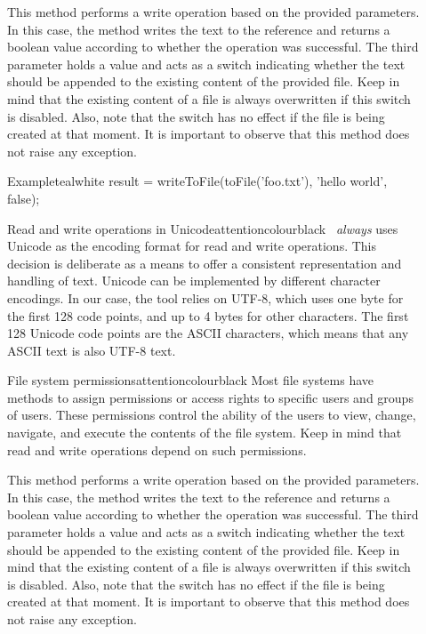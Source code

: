 \begin{description}
\item[] This method performs a write operation based on the provided parameters. In this case, the method writes the  text to the  reference and returns a boolean value according to whether the operation was successful. The third parameter holds a  value and acts as a switch indicating whether the text should be appended to the existing content of the provided file. Keep in mind that the existing content of a file is always overwritten if this switch is disabled. Also, note that the switch has no effect if the file is being created at that moment. It is important to observe that this method does not raise any exception.

\begin{codebox}{Example}{teal}{\icnote}{white}
result = writeToFile(toFile('foo.txt'), 'hello world', false);
\end{codebox}

\begin{messagebox}{Read and write operations in Unicode}{attentioncolour}{\icattention}{black}
\arara\ \emph{always} uses Unicode as the encoding format for read and write operations. This decision is deliberate as a means to offer a consistent representation and handling of text. Unicode can be implemented by different character encodings. In our case, the tool relies on UTF-8, which uses one byte for the first 128 code points, and up to 4 bytes for other characters. The first 128 Unicode code points are the ASCII characters, which means that any ASCII text is also UTF-8 text.
\end{messagebox}

\begin{messagebox}{File system permissions}{attentioncolour}{\icattention}{black}
Most file systems have methods to assign permissions or access rights to specific users and groups of users. These permissions control the ability of the users to view, change, navigate, and execute the contents of the file system. Keep in mind that read and write operations depend on such permissions.
\end{messagebox}

\item[] This method performs a write operation based on the provided parameters. In this case, the method writes the  text to the  reference and returns a boolean value according to whether the operation was successful. The third parameter holds a  value and acts as a switch indicating whether the text should be appended to the existing content of the provided file. Keep in mind that the existing content of a file is always overwritten if this switch is disabled. Also, note that the switch has no effect if the file is being created at that moment. It is important to observe that this method does not raise any exception.


\end{description}
